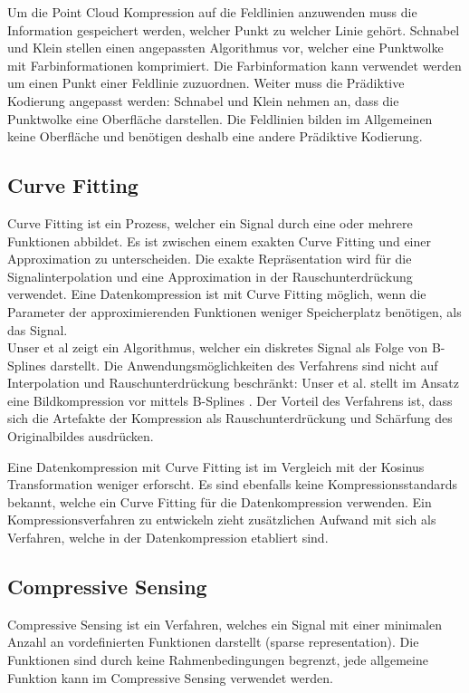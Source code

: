 Um die Point Cloud Kompression auf die Feldlinien anzuwenden muss die Information gespeichert werden, welcher Punkt zu welcher Linie gehört. Schnabel und Klein stellen einen angepassten Algorithmus vor, welcher eine Punktwolke mit Farbinformationen komprimiert. Die Farbinformation kann verwendet werden um einen Punkt einer Feldlinie zuzuordnen. Weiter muss die Prädiktive Kodierung angepasst werden: Schnabel und Klein nehmen an, dass die Punktwolke eine Oberfläche darstellen. Die Feldlinien bilden im Allgemeinen keine Oberfläche und benötigen deshalb eine andere Prädiktive Kodierung.

\subsection{Curve Fitting}
Curve Fitting ist ein Prozess, welcher ein Signal durch eine oder mehrere Funktionen abbildet. Es ist zwischen einem exakten Curve Fitting und einer Approximation zu unterscheiden. Die exakte Repräsentation wird für die Signalinterpolation und eine Approximation in der Rauschunterdrückung verwendet. Eine Datenkompression ist mit Curve Fitting möglich, wenn die Parameter der approximierenden Funktionen weniger Speicherplatz benötigen, als das Signal.\\
Unser et al \cite{unser1993b:spline} zeigt ein Algorithmus, welcher ein diskretes Signal als Folge von B-Splines darstellt. Die Anwendungsmöglichkeiten des Verfahrens sind nicht auf Interpolation und Rauschunterdrückung beschränkt: Unser et al. stellt im Ansatz eine Bildkompression vor mittels B-Splines \cite{unser1993b2:spline}. Der Vorteil des Verfahrens ist, dass sich die Artefakte der Kompression als Rauschunterdrückung und Schärfung des Originalbildes ausdrücken.

Eine Datenkompression mit Curve Fitting ist im Vergleich mit der Kosinus Transformation weniger erforscht. Es sind ebenfalls keine Kompressionsstandards bekannt, welche ein Curve Fitting für die Datenkompression verwenden. Ein Kompressionsverfahren zu entwickeln zieht zusätzlichen Aufwand mit sich als Verfahren, welche in der Datenkompression etabliert sind.

\subsection{Compressive Sensing}
Compressive Sensing ist ein Verfahren, welches ein Signal mit einer minimalen Anzahl an vordefinierten Funktionen darstellt (sparse representation). Die Funktionen sind durch keine Rahmenbedingungen begrenzt, jede allgemeine Funktion kann im Compressive Sensing verwendet werden. 

